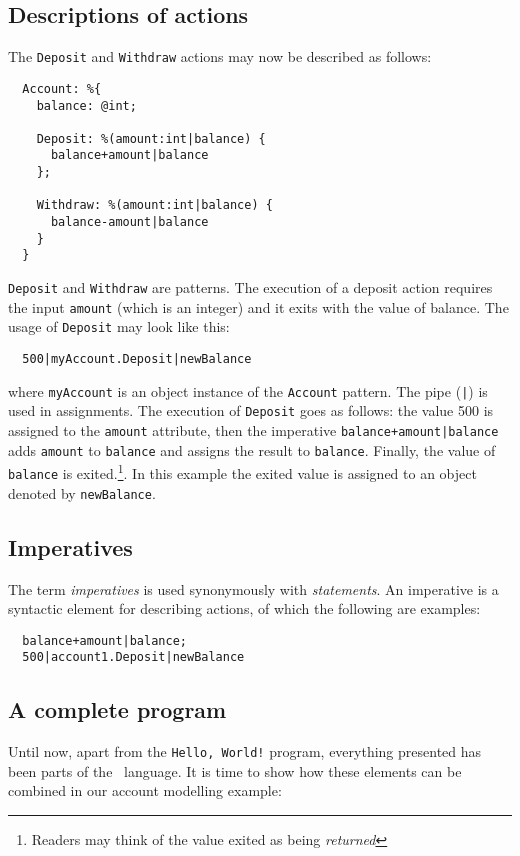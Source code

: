 \subsection*{Descriptions of actions}
The \texttt{Deposit} and \texttt{Withdraw} actions may now be
described as follows:
\begin{verbatim}
  Account: %{
    balance: @int;
    
    Deposit: %(amount:int|balance) {
      balance+amount|balance
    };
    
    Withdraw: %(amount:int|balance) {
      balance-amount|balance
    }
  }
\end{verbatim}
\texttt{Deposit} and \texttt{Withdraw} are patterns. The execution of
a deposit action requires the input \texttt{amount} (which is an
integer) and it exits with the value of balance. The usage of
\texttt{Deposit} may look like this:
\begin{verbatim}
  500|myAccount.Deposit|newBalance
\end{verbatim}
 where \texttt{myAccount} is an object instance of the
 \texttt{Account} pattern. The pipe (\verb$|$) is used in
 assignments. The execution of \texttt{Deposit} goes as follows: the
 value 500 is assigned to the \texttt{amount} attribute, then the
 imperative \texttt{balance+amount|balance} adds \texttt{amount} to
 \texttt{balance} and assigns the result to \texttt{balance}. Finally,
 the value of \texttt{balance} is exited.\footnote{Readers may think
   of the value exited as being \emph{returned}}. In this example the
 exited value is assigned to an object denoted by \texttt{newBalance}.

\subsection*{Imperatives}
The term \emph{imperatives} is used synonymously with
\emph{statements}. An imperative is a syntactic element for describing 
actions, of which the following are examples:
\begin{verbatim}
  balance+amount|balance;
  500|account1.Deposit|newBalance
\end{verbatim}

\subsection*{A complete program}
Until now, apart from the \texttt{Hello, World!} program, everything
presented has been parts of the \gbeta\ language. It is time to show
how these elements can be combined in our account modelling example:

